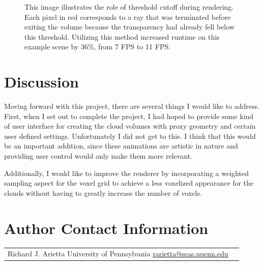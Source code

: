 \documentclass{jcgt}
\begin{document}
\begin{figure}[htb]
  \centering
  \hfill
  \hfill
  \hfill
  \caption{\label{fig:threshold_performance}
     This image illustrates the role of threshold cutoff during rendering. Each pixel
     in red corresponds to a ray that was terminated before exiting the volume because
     the transparency had already fell below this threshold. Utilizing this method
     increased runtime on this example scene by 36\%, from 7 FPS to 11 FPS.}
\end{figure}

\section{Discussion}

Moving forward with this project, there are several things I would like to address. First,
when I set out to complete the project, I had hoped to provide some kind of user interface
for creating the cloud volumes with proxy geometry and certain user defined settings.
Unfortunately I did not get to this. I think that this would be an important addition, 
since these animations are artistic in nature and providing user control would only make them more relevant.

Additionally, I would like to improve the renderer by incorporating a weighted sampling aspect
for the voxel grid to achieve a less voxelized appearance for the clouds without having to
greatly increase the number of voxels.

\section*{Author Contact Information}

\hspace{-2mm}\begin{tabular}{p{}p{}}
Richard J. Arietta \newline
University of Pennsylvania \newline
\href{mailto:rarietta@seas.upenn.edu}{rarietta@seas.upenn.edu}

\end{tabular}

\small
\afterdoc
\end{document}
